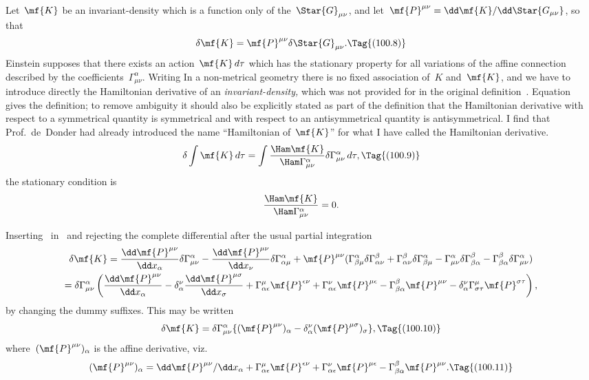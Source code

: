 \documentclass[12pt]{book}
\begin{document}
Let~$\mf{K}$ be an invariant\hyp{}density which is a function only of the~$\Star{G}_{\mu\nu}$, and
let~$\mf{P}^{\mu\nu} = \dd\mf{K}/\dd\Star{G_{\mu\nu}}$, so that
\[
\delta\mf{K} = \mf{P}^{\mu\nu}\delta\Star{G}_{\mu\nu}.
\Tag{(100.8)}
\]
Einstein supposes that there exists an action~$\mf{K}\,d\tau$ which has the stationary property for all variations
of the affine connection described by the coefficients~$\Gamma^\alpha_{\mu\nu}$.
Writing\footnotemark\footnotetext
     {In a non\hyp{}metrical geometry there is no fixed association of~$K$ and~$\mf{K}$, and we have to introduce
      directly the Hamiltonian derivative of an \emph{invariant\hyp{}density,} which was not provided for in
      the original definition~.
      Equation~ gives the definition; to remove ambiguity it should also be explicitly stated as part
      of the definition that the Hamiltonian derivative with respect to a symmetrical quantity is symmetrical and
      with respect to an antisymmetrical quantity is antisymmetrical.
      I find that Prof.~de~Donder had already introduced the name ``Hamiltonian of~$\mf{K}$'' for what I have called
      the Hamiltonian derivative.}
\[
\delta\int\mf{K}\,d\tau = \int\frac{\Ham\mf{K}}{\Ham\Gamma^\alpha_{\mu\nu}}\delta\Gamma^\alpha_{\mu\nu}\,d\tau,
\Tag{(100.9)}
\]
the stationary condition is
\[
\frac{\Ham\mf{K}}{\Ham\Gamma^\alpha_{\mu\nu}} = 0.
\]

Inserting~ in~ and rejecting the complete differential after the usual partial integration
\begin{multline*}
\delta\mf{K}  = \frac{\dd\mf{P}^{\mu\nu}}{\dd x_\alpha}\delta\Gamma^\alpha_{\mu\nu} -
               \frac{\dd\mf{P}^{\mu\nu}}{\dd x_\nu}\delta\Gamma^\alpha_{\alpha\mu} +
    \mf{P}^{\mu\nu}(\Gamma^\alpha_{\beta\mu}\delta\Gamma^\beta_{\alpha\nu} +
                   \Gamma^\beta_{\alpha\nu}\delta\Gamma^\alpha_{\beta\mu} -
                   \Gamma^\alpha_{\mu\nu}\delta\Gamma^\beta_{\beta\alpha} -
                   \Gamma^\beta_{\beta\alpha}\delta\Gamma^\alpha_{\mu\nu})\\
             = \delta\Gamma^\alpha_{\mu\nu}
  \left(
    \frac{\dd\mf{P}^{\mu\nu}}{\dd x_\alpha} - \delta^\nu_\alpha\frac{\dd\mf{P}^{\mu\sigma}}{\dd x_\sigma} +
    \Gamma^\mu_{\alpha\epsilon}\mf{P}^{\epsilon\nu} +
    \Gamma^\nu_{\alpha\epsilon}\mf{P}^{\mu\epsilon} -
    \Gamma^\beta_{\beta\alpha}\mf{P}^{\mu\nu} -
    \delta^\nu_\alpha\Gamma^\mu_{\sigma\tau}\mf{P}^{\sigma\tau}
  \right),
\end{multline*}
by changing the dummy suffixes.
This may be written
\[
\delta\mf{K} = \delta\Gamma^\alpha_{\mu\nu}\{(\mf{P}^{\mu\nu})_\alpha - \delta^\nu_\alpha(\mf{P}^{\mu\sigma})_\sigma\},
\Tag{(100.10)}
\]
where~$(\mf{P}^{\mu\nu})_\alpha$ is the affine derivative, viz.
\[
(\mf{P}^{\mu\nu})_\alpha = \dd\mf{P}^{\mu\nu}/\dd x_\alpha
       + \Gamma^{\mu}_{\alpha\epsilon}\mf{P}^{\epsilon\nu}
       + \Gamma^{\nu}_{\alpha\epsilon}\mf{P}^{\mu\epsilon}
       - \Gamma^{\beta}_{\beta\alpha}\mf{P}^{\mu\nu}.
\Tag{(100.11)}
\]
\end{document}
